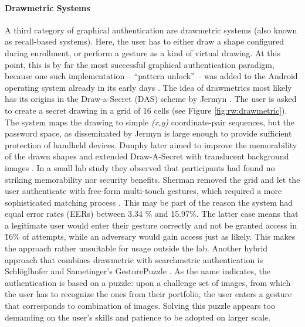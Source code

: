 	\paragraph{Drawmetric Systems}
	A third category of graphical authentication are drawmetric systems (also known as recall-based systems). Here, the user has to either draw a shape configured during enrollment, or perform a gesture as a kind of virtual drawing. At this point, this is by far the most successful graphical authentication paradigm, because one such implementation -- ``pattern unlock'' -- was added to the Android operating system already in its early days \cite{Aviv2010SmudgeAttacks}. The idea of drawmetrics most likely has its origins in the Draw-a-Secret (DAS) scheme by Jermyn \etal \cite{Jermyn1999DrawASecret}. The user is asked to create a secret drawing in a grid of 16 cells (see Figure \ref{fig:rw:drawmetric}). The system maps the drawing to simple \textit{(x,y)} coordinate-pair sequences, but the password space, as disseminated by Jermyn \etal is large enough to provide sufficient protection of handheld devices. Dunphy \etal later aimed to improve the memorability of the drawn shapes and extended Draw-A-Secret with translucent background images \cite{Dunphy2007BDAS}. In a small lab study they observed that participants had found no striking memorability nor security benefits. Sherman \etal removed the grid and let the user authenticate with free-form multi-touch gestures, which required a more sophisticated matching process \cite{Sherman2014UserGeneratedGesturesAuth}. This may be part of the reason the system had equal error rates (EERs) between 3.34 \% and 15.97\%. The latter case means that a legitimate user would enter their gesture correctly and not be granted access in \~16\% of attempts, while an adversary would gain access just as likely. This makes the approach rather unsuitable for usage outside the lab. Another hybrid approach that combines drawmetric with searchmetric authentication is Schlöglhofer and Sametinger's GesturePuzzle \cite{Schloglhofer2012SecureAndUsableMobileAuth}. As the name indicates, the authentication is based on a puzzle: upon a challenge set of images, from which the user has to recognize the ones from their portfolio, the user enters a gesture that corresponds to combination of images. Solving this puzzle appears too demanding on the user's skills and patience to be adopted on larger scale. 
	
